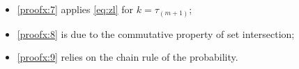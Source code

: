\documentclass[journal,twoside,web]{ieeecolor}
\begin{document}
\begin{figure*}[ht]
\begin{itemize}
\item \eqref{proofx:7} applies \eqref{eq:zl} for $k=\tau_{(m+1)}$;
\item \eqref{proofx:8} is due to the commutative property of set intersection;
\item \eqref{proofx:9} relies on the chain rule of the probability.
\end{itemize}
\end{figure*}



% 
% 
\end{document}
